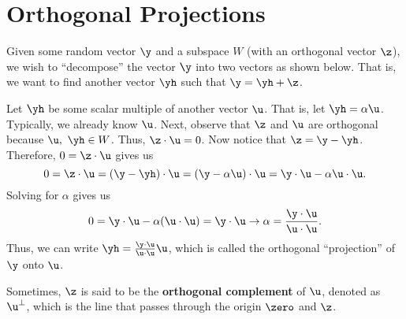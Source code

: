 
\section{Orthogonal Projections}
\label{sec:orthogonal_projections}

Given some random vector $\y$ and a subspace $W$ (with an orthogonal vector
$\z$), we wish to ``decompose'' the vector $\y$ into two vectors as shown
below. That is, we want to find another vector $\yh$ such that $\y = \yh + \z$.

\begin{figure}[H]
  \centering


  \caption{}
  \label{fig:projection}
\end{figure}

Let $\yh$ be some scalar multiple of another vector $\u$. That is, let $\yh =
\alpha\u$. Typically, we already know $\u$. Next, observe that $\z$ and $\u$ are
orthogonal because $\u,~\yh \in W$. Thus, $\z \cdot \u = 0$. Now notice that $\z
= \y - \yh$. Therefore, $0 = \z \cdot \u$ gives us
\[%
  0 = \z \cdot \u = (\y - \yh) \cdot \u = (\y - \alpha\u) \cdot \u = \y \cdot \u - \alpha \u \cdot \u
.\]%
Solving for $\alpha$ gives us
\[%
  0 = \y \cdot \u - \alpha(\u \cdot \u) = \y \cdot \u \rightarrow \alpha = \frac{\y \cdot \u}{\u \cdot \u}
.\]%
Thus, we can write $\yh = \frac{\y \cdot \u}{\u \cdot \u}\u$, which is
called the orthogonal ``projection'' of $\y$ onto $\u$.

\begin{note}
  \label{nte:orthogonal_complement}

  Sometimes, $\z$ is said to be the \textbf{orthogonal complement} of $\u$,
  denoted as $\u^\perp$, which is the line that passes through the origin
  $\zero$ and $\z$.
\end{note}

